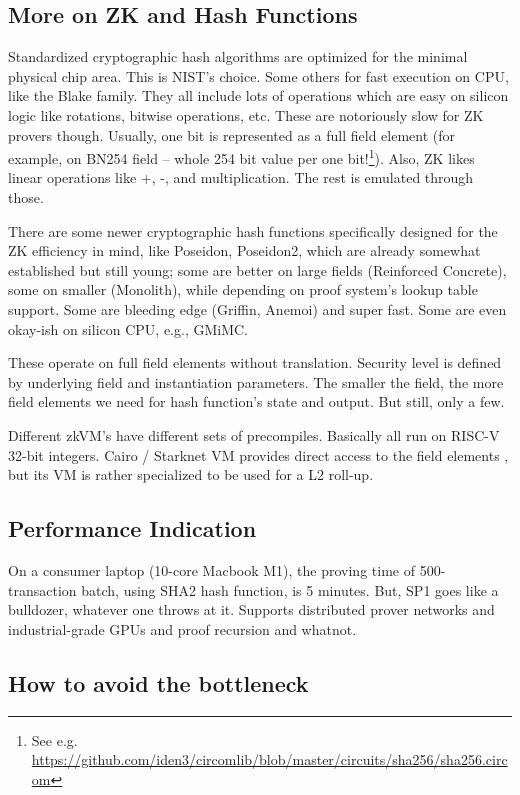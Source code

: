 \documentclass{llncs}
\begin{document}
\subsection{More on ZK and Hash Functions}

Standardized cryptographic hash algorithms are optimized for the minimal physical chip area. This is NIST's choice. Some others for fast execution on CPU, like the Blake family. They all include lots of operations which are easy on silicon logic like rotations, bitwise operations, etc. These are notoriously slow for ZK provers though. Usually, one bit is represented as a full field element (for example, on BN254 field -- whole 254 bit value per one bit!\footnote{See e.g. \url{https://github.com/iden3/circomlib/blob/master/circuits/sha256/sha256.circom}}). Also, ZK likes linear operations like +, -, and  multiplication. The rest is emulated through those.

There are some newer cryptographic hash functions specifically designed for the ZK efficiency in mind, like Poseidon, Poseidon2, which are already somewhat established but still young; some are better on large fields (Reinforced Concrete), some on smaller (Monolith), while depending on proof system's lookup table support. Some are bleeding edge (Griffin, Anemoi) and super fast. Some are even okay-ish on silicon CPU, e.g., GMiMC.

These operate on full field elements without translation. Security level is defined by underlying field and instantiation parameters. The smaller the field, the more field elements we need for hash function's state and output. But still, only a few.

Different zkVM's have different sets of precompiles. Basically all run on RISC-V 32-bit integers. Cairo / Starknet VM provides direct access to the field elements , but its VM is rather specialized to be used for a L2 roll-up.


\subsection{Performance Indication}

On a consumer laptop (10-core Macbook M1), the proving time of 500-transaction batch, using SHA2 hash function, is 5 minutes. But, SP1 goes like a bulldozer, whatever one throws at it. Supports distributed prover networks and industrial-grade GPUs and proof recursion and whatnot.


\subsection{How to avoid the bottleneck}
\end{document}
